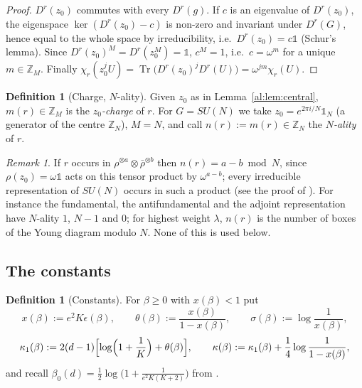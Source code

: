 \documentclass[11pt,a4paper]{article}
\theoremstyle{definition}
\newtheorem{definition}[theorem]{Definition}
\theoremstyle{remark}
\newtheorem{remark}[theorem]{Remark}
\DeclareMathOperator{\Tr}{Tr}
\newcommand{\Z}{\mathbb{Z}}
\newcommand{\Fref}[3]{\cite[#1~`#2' (\texttt{#3})]{F}}
\begin{document}
\begin{proof}
$D^r(z_0)$ commutes with every $D^r(g)$. If $c$ is an eigenvalue of $D^r(z_0)$, the eigenspace $\ker(D^r(z_0)-c)$ is
non-zero and invariant under $D^r(G)$, hence equal to the whole space by irreducibility, i.e.\ $D^r(z_0)=c\mathbb1$
(Schur's lemma). Since $D^r(z_0)^M=D^r(z_0^M)=\mathbb 1$, $c^M=1$, i.e.\ $c=\omega^{m}$ for a unique $m\in\Z_M$. Finally
$\chi_r(z_0^jU)=\Tr\bigl(D^r(z_0)^jD^r(U)\bigr)=\omega^{jm}\chi_r(U)$.
\end{proof}

\begin{definition}[Charge, $N$-ality]\label{al:def:charge}
Given $z_0$ as in Lemma~\ref{al:lem:central}, $m(r)\in\Z_M$ is the \emph{$z_0$-charge} of $r$. For $G=SU(N)$ we take
$z_0=e^{2\pi i/N}\mathbb 1_N$ (a generator of the centre $\Z_N$), $M=N$, and call $n(r):=m(r)\in\Z_N$ the
\emph{$N$-ality} of $r$.
\end{definition}

\begin{remark}\label{al:rem:nality}
If $r$ occurs in $\rho^{\otimes a}\otimes\bar\rho^{\otimes b}$ then $n(r)=a-b\bmod N$, since $\rho(z_0)=\omega\mathbb1$
acts on this tensor product by $\omega^{a-b}$; every irreducible representation of $SU(N)$ occurs in such a product (see
the proof of \Fref{Lemma}{Positivity of the character coefficients}{lem:cr}). For instance the fundamental, the
antifundamental and the adjoint representation have $N$-ality $1$, $N-1$ and $0$; for highest weight $\lambda$,
$n(r)$ is the number of boxes of the Young diagram modulo $N$. None of this is used below.
\end{remark}

\subsection{The constants}

\begin{definition}[Constants]\label{al:def:constants}
For $\beta\ge0$ with $x(\beta)<1$ put
\[
x(\beta):=e^2K\epsilon(\beta),\qquad \theta(\beta):=\frac{x(\beta)}{1-x(\beta)},\qquad \sigma(\beta):=\log\frac1{x(\beta)},
\]
\[
\kappa_1(\beta):=2(d-1)\Bigl[\log\Bigl(1+\frac1K\Bigr)+\theta(\beta)\Bigr],\qquad
\kappa(\beta):=\kappa_1(\beta)+\frac14\log\frac1{1-x(\beta)},
\]
and recall $\beta_0(d)=\frac12\log\bigl(1+\frac1{e^2K(K+2)}\bigr)$ from \Fref{Theorem}{Convergence of the
strong-coupling cluster expansion}{thm:conv}.
\end{definition}
\end{document}
